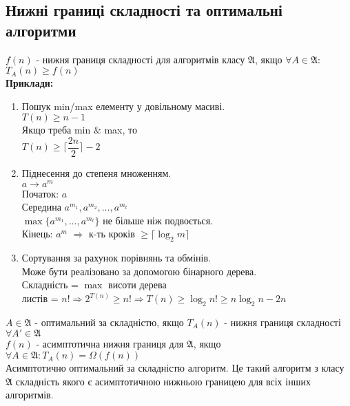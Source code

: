 \documentclass[a4paper,12pt]{article}
\begin{document}
    \subsection{Нижні границі складності та оптимальні алгоритми}
    $f(n)$ - нижня границя складності для алгоритмів  класу $\mathfrak{A}$, якщо $\forall A\in\mathfrak{A}$: $T_A(n)\geqslant f(n)$ \\
    \textbf{Приклади:}
    \begin{enumerate}
        \item Пошук min/max елементу у довільному масиві. \\
        $T(n)\geqslant n-1$ \\
        Якщо треба min $\&$ max, то \\
        $T(n)\geqslant \bigg\lceil \dfrac{2n}{2}\bigg\rceil-2$ 
        \item Піднесення до степеня множенням. \\
        $a\rightarrow a^m$ \\
        Початок: $a$ \\
        Середина $a^{m_1},a^{m_2},...,a^{m_t}$ \\
        $\max\{a^{m_1},...,a^{m_t}\}$ не більше ніж подвоється. \\
        Кінець: $a^m$ $\Rightarrow$ к-ть кроків $\geqslant\bigg\lceil \log_2m\bigg\rceil$
        \item Сортування за рахунок порівнянь та обмінів. \\
        Може бути реалізовано за допомогою бінарного дерева. \\
        Складність = $\max$ висоти дерева \\
        листів = $n!\Rightarrow 2^{T(n)}\geqslant n!\Rightarrow T(n)\geqslant \log_2n!\geqslant n\log_2n-2n$ 
    \end{enumerate}
    $A\in\mathfrak{A}$ - оптимальний за складністю, якщо $T_A(n)$ - нижня границя складності
    $\forall A'\in\mathfrak{A}$ \\
    $f(n)$ - асимптотична нижня границя для $\mathfrak{A}$, якщо $\forall A\in\mathfrak{A}:T_A(n)=\Omega(f(n))$ \\
    Асимптотично оптимальний за складністю алгоритм. Це такий алгоритм з класу $\mathfrak{A}$ 
    складність якого є асимптотичною нижньою границею для всіх інших алгоритмів. 
\end{document}
